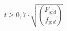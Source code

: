 \documentclass[12pt]{article}
\begin{document}
\begin{displaymath}
t \geq 0,7 \cdot \sqrt { \left( \frac {F_{s;d}} {f_{y;d}} \right)}
\end{displaymath}
\end{document}
